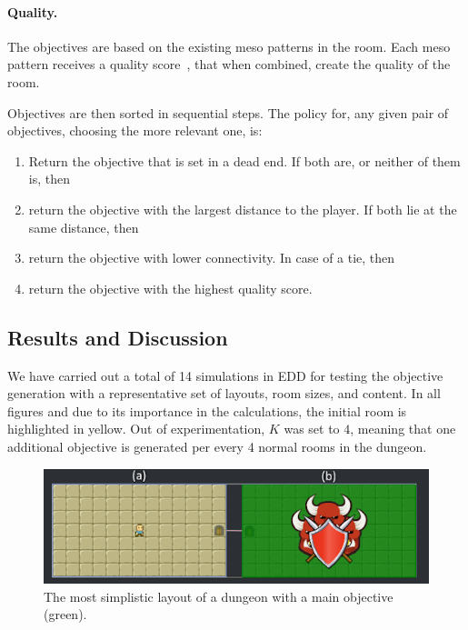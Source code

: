 \paragraph*{Quality.} The objectives are based on the existing meso patterns in the room. Each meso pattern receives a quality score~\cite{p7Baldwin2017}, that when combined, create the quality of the room.


Objectives are then sorted in sequential steps. The policy for, any given pair of objectives, choosing the more relevant one, is:
\begin{enumerate}
    \item Return the objective that is set in a dead end. If both are, or neither of them is, then
    \item return the objective with the largest distance to the player. If both lie at the same distance, then
    \item return the objective with lower connectivity. In case of a tie, then
    \item return the objective with the highest quality score.
\end{enumerate}


\subsection{Results and Discussion}

We have carried out a total of 14 simulations in EDD for testing the objective generation with a representative set of layouts, room sizes, and content. In all figures and due to its importance in the calculations, the initial room is highlighted in yellow. Out of experimentation, $K$ was set to $4$, meaning that one additional objective is generated per every 4 normal rooms in the dungeon.

\begin{figure}[h]
  \centering
  \includegraphics[width=\columnwidth]{included-papers-tex/paper-7/Figures/results1.png}
  \caption{The most simplistic layout of a dungeon with a main objective (green).}
  \label{fig:oldfig5}
\end{figure}


